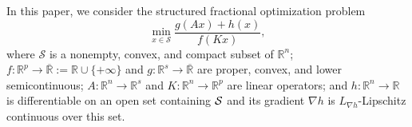 \documentclass[11pt]{article}
\numberwithin{equation}{section}
\begin{document}

In this paper, we consider the structured fractional optimization problem
\begin{equation}\label{eq:fractional-problem}
    \min_{x\in\mathcal S}
    \frac{g(Ax)+h(x)}{f(Kx)},
\end{equation}
where \(\mathcal S\) is a nonempty, convex, and compact subset of
\(\mathbb R^n\);
\(f:\mathbb R^p\to\overline{\mathbb R}:=\mathbb R\cup\{+\infty\}\) and
\(g:\mathbb R^s\to\overline{\mathbb R}\) are proper, convex, and lower
semicontinuous;
\(A:\mathbb R^n\to\mathbb R^s\) and
\(K:\mathbb R^n\to\mathbb R^p\) are linear operators; and
\(h:\mathbb R^n\to\mathbb R\) is  differentiable on an open set containing ${\cal S}$  and its gradient $\nabla h$ is $L_{\nabla h}$-Lipschitz continuous over this  set.


\end{document}
